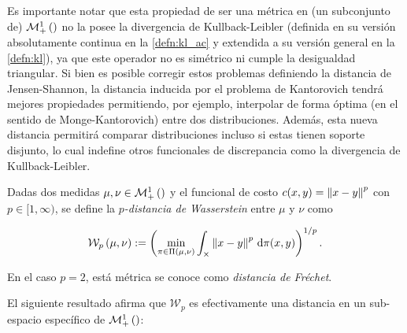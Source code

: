 Es importante notar que esta propiedad de ser una métrica en (un subconjunto de) $\mathcal{M}_+^1\left(\right)$ no la posee la divergencia de Kullback-Leibler (definida en su versión absolutamente continua en la \autoref{defn:kl_ac} y extendida a su versión general en la \autoref{defn:kl}), ya que este operador no es simétrico ni cumple la desigualdad triangular. Si bien es posible corregir estos problemas definiendo la distancia de Jensen-Shannon, la distancia inducida por el problema de Kantorovich tendrá mejores propiedades permitiendo, por ejemplo, interpolar de forma óptima (en el sentido de Monge-Kantorovich) entre dos distribuciones. Además, esta nueva distancia permitirá comparar distribuciones incluso si estas tienen soporte disjunto, lo cual indefine otros funcionales de discrepancia como la divergencia de Kullback-Leibler.

\begin{defn}
	Dadas dos medidas $\mu,\nu\in\mathcal{M}_+^1\left(\right)$ y el funcional de costo $c(x,y)=\left\lVert x-y \right\rVert^p$ con $p\in[1,\infty)$, se define la \textit{$p$-distancia de Wasserstein} entre $\mu$ y $\nu$ como

	\begin{equation*}
		\mathcal{W}_{p}\left(\mu, \nu\right) := \left(\min_{\pi \in \Pi(\mu, \nu)} \int_{\times} \left\lVert x-y \right\rVert^p \,\operatorname{d}\!\pi(x, y) \right)^{1/p}.
	\end{equation*}

	En el caso $p=2$, está métrica se conoce como \textit{distancia de Fréchet}.

\end{defn}

El siguiente resultado afirma que $\mathcal{W}_p$ es efectivamente una distancia en un sub-espacio específico de $\mathcal{M}_+^1\left(\right)$:




